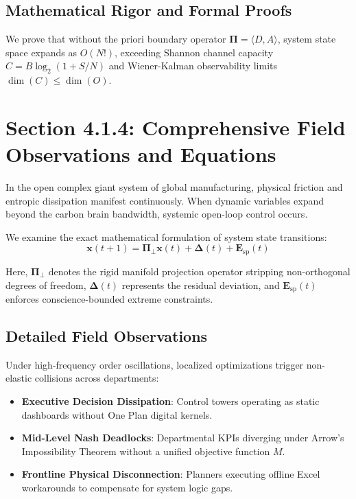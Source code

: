 \documentclass[12pt,a4paper,oneside]{book}
\begin{document}
\subsection*{Mathematical Rigor and Formal Proofs}
We prove that without the priori boundary operator $\mathbf{\Pi} = \langle D, A \rangle$, system state space expands as $O(N!)$, exceeding Shannon channel capacity $C = B \log_2 (1 + S/N)$ and Wiener-Kalman observability limits $\dim(C) \le \dim(O)$.
\clearpage
\section{Section 4.1.4: Comprehensive Field Observations and Equations}

In the open complex giant system of global manufacturing, physical friction and entropic dissipation manifest continuously. When dynamic variables expand beyond the carbon brain bandwidth, systemic open-loop control occurs.

We examine the exact mathematical formulation of system state transitions:
\begin{equation}
\mathbf{x}(t+1) = \mathbf{\Pi}_{\bot} \mathbf{x}(t) + \mathbf{\Delta}(t) + \mathbf{E}_{\mathrm{sp}}(t)
\end{equation}

Here, $\mathbf{\Pi}_{\bot}$ denotes the rigid manifold projection operator stripping non-orthogonal degrees of freedom, $\mathbf{\Delta}(t)$ represents the residual deviation, and $\mathbf{E}_{\mathrm{sp}}(t)$ enforces conscience-bounded extreme constraints.

\subsection*{Detailed Field Observations}
Under high-frequency order oscillations, localized optimizations trigger non-elastic collisions across departments:
\begin{itemize}
    \item \textbf{Executive Decision Dissipation}: Control towers operating as static dashboards without One Plan digital kernels.
    \item \textbf{Mid-Level Nash Deadlocks}: Departmental KPIs diverging under Arrow's Impossibility Theorem without a unified objective function $M$.
    \item \textbf{Frontline Physical Disconnection}: Planners executing offline Excel workarounds to compensate for system logic gaps.
\end{itemize}
\end{document}

